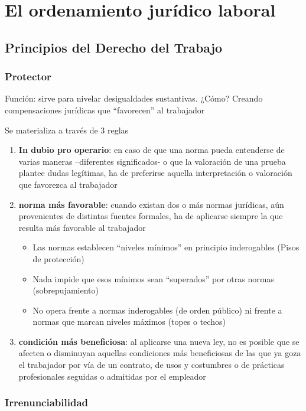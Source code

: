 \documentclass[spanish,12pt,a4paper,titlepage]{report}
\begin{document}
\part{El ordenamiento jurídico laboral}

\chapter{Principios del Derecho del Trabajo}

\section{Protector }

Función: sirve para nivelar desigualdades sustantivas. ¿Cómo? Creando compensaciones jurídicas que “favorecen” al trabajador 

Se materializa a través de 3 reglas
\begin{enumerate}
\item \textbf{In dubio pro operario}: en caso de que una norma pueda entenderse de varias maneras –diferentes significados- o que la valoración de una prueba plantee dudas legítimas, ha de preferirse aquella interpretación o valoración que favorezca al trabajador
\item \textbf{norma más favorable}: cuando existan dos o más normas jurídicas, aún provenientes de distintas fuentes formales, ha de aplicarse siempre la que resulta más favorable al trabajador

\begin{itemize}
\item Las normas establecen “niveles mínimos” en principio inderogables   (Pisos de protección)
\item Nada impide que esos mínimos sean “superados” por otras normas (sobrepujamiento)
\item No opera frente a normas inderogables (de orden público)
ni frente a normas que marcan niveles máximos (topes o techos)
\end{itemize}
\item \textbf{condición más beneficiosa}: al aplicarse una nueva ley, no es posible que se afecten o disminuyan aquellas condiciones más beneficiosas de las que ya goza el trabajador por vía de un contrato, de usos y costumbres o de prácticas profesionales seguidas o admitidas por el empleador
\end{enumerate}

\section{Irrenunciabilidad}
\end{document}
